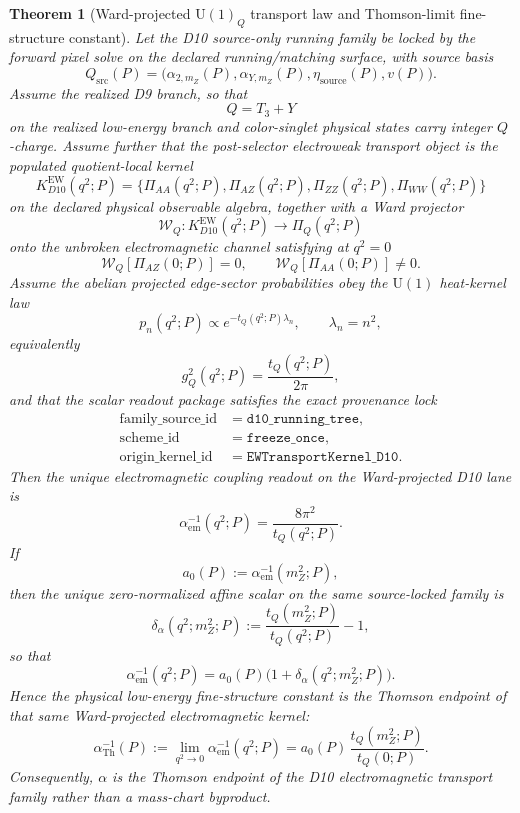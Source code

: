 \documentclass[11pt]{article}
\newtheorem{theorem}{Theorem}[section]
\newcommand{\U}{\mathrm{U}}
\begin{document}
\begin{theorem}[Ward-projected \texorpdfstring{\(\U(1)_Q\)}{U(1)_Q} transport law and Thomson-limit fine-structure constant]\label{thm:ward_u1q_transport}
Let the D10 source-only running family be locked by the forward pixel solve on the declared
running/matching surface, with source basis
\[
Q_{\mathrm{src}}(P)=
\bigl(\alpha_{2,m_Z}(P),\alpha_{Y,m_Z}(P),\eta_{\mathrm{source}}(P),v(P)\bigr).
\]
Assume the realized D9 branch, so that
\[
Q=T_3+Y
\]
on the realized low-energy branch and color-singlet physical states carry integer \(Q\)-charge.
Assume further that the post-selector electroweak transport object is the populated quotient-local
kernel
\[
K^{\mathrm{EW}}_{D10}(q^2;P)
=
\bigl\{\Pi_{AA}(q^2;P),\Pi_{AZ}(q^2;P),\Pi_{ZZ}(q^2;P),\Pi_{WW}(q^2;P)\bigr\}
\]
on the declared physical observable algebra, together with a Ward projector
\[
\mathcal W_Q:
K^{\mathrm{EW}}_{D10}(q^2;P)\longrightarrow \Pi_Q(q^2;P)
\]
onto the unbroken electromagnetic channel satisfying at \(q^2=0\)
\[
\mathcal W_Q[\Pi_{AZ}(0;P)]=0,
\qquad
\mathcal W_Q[\Pi_{AA}(0;P)]\neq 0.
\]
Assume the abelian projected edge-sector probabilities obey the \(\U(1)\) heat-kernel law
\[
p_n(q^2;P)\propto e^{-t_Q(q^2;P)\lambda_n},
\qquad
\lambda_n=n^2,
\]
equivalently
\[
g_Q^2(q^2;P)=\frac{t_Q(q^2;P)}{2\pi},
\]
and that the scalar readout package satisfies the exact provenance lock
\[
\begin{aligned}
\text{family\_source\_id} &= \texttt{d10\_running\_tree},\\
\text{scheme\_id} &= \texttt{freeze\_once},\\
\text{origin\_kernel\_id} &= \texttt{EWTransportKernel\_D10}.
\end{aligned}
\]
Then the unique electromagnetic coupling readout on the Ward-projected D10 lane is
\[
\alpha_{\mathrm{em}}^{-1}(q^2;P)=\frac{8\pi^2}{t_Q(q^2;P)}.
\]
If
\[
a_0(P):=\alpha_{\mathrm{em}}^{-1}(m_Z^2;P),
\]
then the unique zero-normalized affine scalar on the same source-locked family is
\[
\delta_\alpha(q^2;m_Z^2;P)
:=
\frac{t_Q(m_Z^2;P)}{t_Q(q^2;P)}-1,
\]
so that
\[
\alpha_{\mathrm{em}}^{-1}(q^2;P)
=
a_0(P)\bigl(1+\delta_\alpha(q^2;m_Z^2;P)\bigr).
\]
Hence the physical low-energy fine-structure constant is the Thomson endpoint of that same
Ward-projected electromagnetic kernel:
\[
\alpha_{\mathrm{Th}}^{-1}(P)
:=
\lim_{q^2\to0}\alpha_{\mathrm{em}}^{-1}(q^2;P)
=
a_0(P)\,\frac{t_Q(m_Z^2;P)}{t_Q(0;P)}.
\]
Consequently, \(\alpha\) is the Thomson endpoint of the D10 electromagnetic transport family
rather than a mass-chart byproduct.
\end{theorem}
\end{document}
